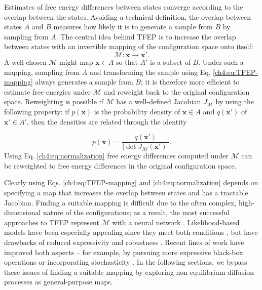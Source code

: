Estimates of free energy differences between states converge according to the overlap between the states. Avoiding a technical definition, the overlap between states $A$ and $B$ measures how likely it is to generate a sample from $B$ by sampling from $A$. The central idea behind TFEP is to increase the overlap between states with an invertible mapping of the configuration space onto itself:
\begin{equation}
    \label{ch4:eq:TFEP-mapping}
    \mathcal{M}:\mathbf{x}\rightarrow\mathbf{x}'.
\end{equation}
A well-chosen $\mathcal{M}$ might map $\mathbf{x} \in A$ so that $A'$ is a subset of $B$. Under such a mapping, sampling from $A$ and transforming the sample using Eq. \ref{ch4:eq:TFEP-mapping} always generates a sample from $B$; it is therefore more efficient to estimate free energies under $\mathcal{M}$ and reweight back to the original configuration space. Reweighting is possible if $\mathcal{M}$ has a well-defined Jacobian $J_\mathcal{M}$ by using the following property: if $p(\mathbf{x})$ is the probability density of $\mathbf{x} \in A$ and $q(\mathbf{x}')$ of $\mathbf{x}' \in A'$, then the densities are related through the identity

\begin{equation}
    \label{ch4:eq:normalization}
    p(\mathbf{x}) = \frac{q(\mathbf{x}')}{| \det J_{\mathcal{M}}(\mathbf{x}')|}.
\end{equation}
Using Eq. \ref{ch4:eq:normalization} free energy differences computed under $\mathcal{M}$ can be reweighted to free energy differences in the original configuration space.

Clearly using Eqs. \ref{ch4:eq:TFEP-mapping} and \ref{ch4:eq:normalization} depends on specifying a map that increases the overlap between states and has a tractable Jacobian. Finding a suitable mapping is difficult due to the often complex, high-dimensional nature of the configurations; as a result, the most successful approaches to TFEP represent $\mathcal{M}$ with a neural network \cite{tfep-2020,LFEP}. Likelihood-based models have been especially appealing since they meet both conditions \cite{NFReview,Dinh2017RealNVP,NeuralODE}, but have drawbacks of reduced expressivity and robustness \cite{bbvi}. Recent lines of work have improved both aspects -- for example, by pursuing more expressive black-box operations or incorporating stochasticity \cite{smooth-NF,neural-spline,AIS-NF,StochasticNF}. In the following sections, we bypass these issues of finding a suitable mapping by exploring non-equilibrium diffusion processes as general-purpose maps.

